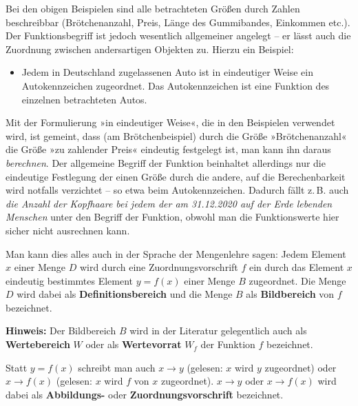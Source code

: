 Bei den obigen Beispielen sind alle betrachteten Größen durch Zahlen beschreibbar (Brötchenanzahl, Preis, Länge des Gummibandes, Einkommen etc.). Der Funktionsbegriff ist jedoch wesentlich allgemeiner angelegt -- er lässt auch die Zuordnung zwischen andersartigen Objekten zu. Hierzu ein Beispiel:
\begin{itemize}
  \item Jedem in Deutschland zugelassenen Auto ist in eindeutiger Weise ein Autokennzeichen zugeordnet. Das Autokennzeichen ist eine Funktion des einzelnen betrachteten Autos.
\end{itemize}

Mit der Formulierung »in eindeutiger Weise«, die in den Beispielen verwendet wird, ist gemeint, dass (am Brötchenbeispiel) durch die Größe »Brötchenanzahl« die Größe »zu zahlender Preis« eindeutig festgelegt ist, man kann ihn daraus \emph{berechnen}. Der allgemeine Begriff der Funktion beinhaltet allerdings nur die eindeutige Festlegung der einen Größe durch die andere, auf die Berechenbarkeit wird notfalls verzichtet -- so etwa beim Autokennzeichen. Dadurch fällt z.\,B. auch \emph{die Anzahl der Kopfhaare bei jedem der am 31.12.2020 auf der Erde lebenden Menschen} unter den Begriff der Funktion, obwohl man die Funktionswerte hier sicher nicht ausrechnen kann.

Man kann dies alles auch in der Sprache der Mengenlehre sagen: Jedem Element $x$ einer Menge $D$ wird durch eine Zuordnungsvorschrift $f$ ein durch das Element $x$ eindeutig bestimmtes Element $y = f(x)$ einer Menge $B$ zugeordnet. Die Menge $D$ wird dabei als \textbf{Definitionsbereich} und die Menge $B$ als \textbf{Bildbereich} von $f$ bezeichnet.


\textbf{Hinweis:} Der Bildbereich $B$ wird in der Literatur gelegentlich auch als \textbf{Wertebereich} $W$ oder als \textbf{Wertevorrat} $W_f$ der Funktion $f$ bezeichnet.

Statt $y = f(x)$ schreibt man auch $x \rightarrow y$ (gelesen: $x$ wird $y$ zugeordnet) oder $x \rightarrow f(x)$ (gelesen: $x$ wird $f$ von $x$ zugeordnet). $x \rightarrow y$ oder $x \rightarrow f(x)$ wird dabei als \textbf{Abbildungs-} oder \textbf{Zuordnungsvorschrift} bezeichnet.

